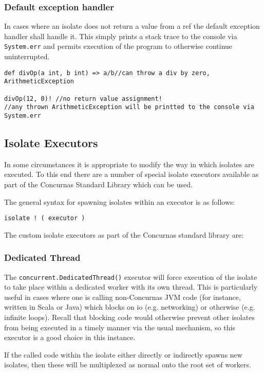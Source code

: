 \documentclass[conc-doc]{subfiles}
\begin{document}
\subsubsection{Default exception handler}
In cases where an isolate does not return a value from a ref the default exception handler shall handle it. This simply prints a stack trace to the console via \lstinline{System.err} and permits execution of the program to otherwise continue uninterrupted.

\begin{lstlisting}
def divOp(a int, b int) => a/b//can throw a div by zero, ArithmeticException

divOp(12, 0)! //no return value assignment!
//any thrown ArithmeticException will be printted to the console via System.err
\end{lstlisting}

\subsection{Isolate Executors}
In some circumstances it is appropriate to modify the way in which isolates are executed. To this end there are a number of special isolate executors available as part of the Concurnas Standard Library which can be used.

The general syntax for spawning isolates within an executor is as follows:

\begin{center}
	\lstinline{isolate ! ( executor )}
\end{center}

The custom isolate executors as part of the Concurnas standard library are:

\subsubsection{Dedicated Thread}
The \lstinline{concurrent.DedicatedThread()} executor will force execution of the isolate to take place within a dedicated worker with its own thread. This is particularly useful in cases where one is calling non-Concurnas JVM code (for instance, written in Scala or Java) which blocks on io (e.g. networking) or otherwise (e.g. infinite loops). Recall that blocking code would otherwise prevent other isolates from being executed in a timely manner via the usual mechanism, so this executor is a good choice in this instance.

If the called code within the isolate either directly or indirectly spawns new isolates, then these will be multiplexed as normal onto the root set of workers.
\end{document}
